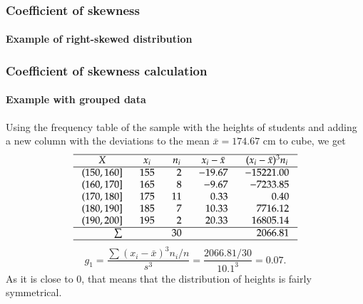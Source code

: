 \begin{frame}
\frametitle{Coefficient of skewness}
\framesubtitle{Example of right-skewed distribution}
\begin{center}
\scalebox{0.6}{}
\end{center}
\end{frame}


\begin{frame}
\frametitle{Coefficient of skewness calculation}
\framesubtitle{Example with grouped data}
Using the frequency table of the sample with the heights of students and adding a new column with the deviations to
the mean $\bar x = 174.67$ cm to cube, we get
\[
\setlength\arraycolsep{3mm}
\setlength\arrayrulewidth{0.5pt}
\begin{array}{rrrrr}
\hline
\multicolumn{1}{c}{X} & \multicolumn{1}{c}{x_i} & \multicolumn{1}{c}{n_i} & \multicolumn{1}{c}{x_i-\bar x} & \multicolumn{1}{c}{(x_i-\bar x)^3 n_i} \\
\hline
(150,160] & 155 & 2 & -19.67 & -15221.00\\
(160,170] & 165 & 8 & -9.67 & -7233.85\\
(170,180] & 175 & 11 & 0.33 & 0.40\\
(180,190] & 185 & 7 & 10.33 & 7716.12\\
(190,200] & 195 & 2 & 20.33 & 16805.14\\
\hline
\sum &  & 30 & & 2066.81 \\
\hline
\end{array}
\]
\[
g_1 = \frac{\sum (x_i-\bar x)^3n_i/n}{s^3} = \frac{2066.81/30}{10.1^3} = 0.07.
\]
As it is close to 0, that means that the distribution of heights is fairly symmetrical. 
\end{frame}


